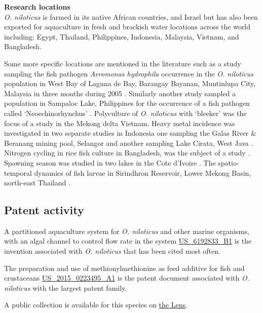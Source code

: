 \documentclass[]{book}
\theoremstyle{definition}
\theoremstyle{definition}
\theoremstyle{definition}
\theoremstyle{remark}
\begin{document}
\textbf{Research locations}\\
\emph{O. niloticus} is farmed in its native African countries, and
Israel but has also been exported for aquaculture in fresh and brackish
water locations across the world including: Egypt, Thailand,
Philippines, Indonesia, Malaysia, Vietnam, and Bangladesh.

Some more specific locations are mentioned in the literature such as a
study sampling the fish pathogen \emph{Aeromonas hydrophila} occurrence
in the \emph{O. niloticus} population in West Bay of Laguna de Bay,
Barangay Bayanan, Muntinlupa City, Malaysia in three months during 2005
\citep{Cabrera_2006}. Similarly another study sampled a population in
Sampaloc Lake, Philippines for the occurrence of a fish pathogen called
`Neoechinorhynchus' \citep{de_la_Cruz_2012}. Polyculture of \emph{O.
niloticus} with `bleeker' was the focus of a study in the Mekong delta
Vietnam. Heavy metal incidence was investigated in two separate studies
in Indonesia one sampling the Galas River \& Beranang mining pool,
Selangor and another sampling Lake Cirata, West Java
\citep{Baharom_2015, Salami_2008}. Nitrogen cycling in rice fish culture
in Bangladesh, was the subject of a study \citep{Oehme_2007}. Spawning
season was studied in two lakes in the Cote d'Ivoire
\citep{Duponchelle_1999}. The spatio-temporal dynamics of fish larvae in
Sirindhron Reservoir, Lower Mekong Basin, north-east Thailand
\citep{Jutagate_2016}.

\hypertarget{patent-activity-5}{%
\subsection{Patent activity}\label{patent-activity-5}}

A partitioned aquaculture system for \emph{O. niloticus} and other
marine organisms, with an algal channel to control flow rate in the
system
\href{https://www.lens.org/lens/patent/US_6192833_B1}{US\_6192833\_B1}
is the invention associated with \emph{O. niloticus} that has been cited
most often.

The preparation and use of methionylmethionine as feed additive for fish
and crustaceans
\href{https://www.lens.org/lens/patent/US_2015_0223495_A1}{US\_2015\_0223495\_A1}
is the patent document associated with \emph{O. niloticus} with the
largest patent family.

A public collection is available for this species on
\href{https://www.lens.org/lens/collection/24913}{the Lens}.
\end{document}
